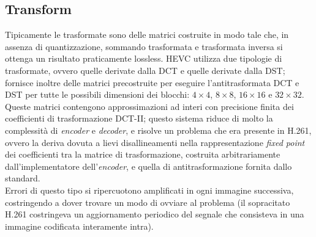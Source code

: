\subsection{Transform}
Tipicamente le trasformate sono delle matrici costruite in modo tale che, in 
assenza di quantizzazione, sommando trasformata e trasformata inversa si 
ottenga un risultato praticamente lossless.
HEVC utilizza due tipologie di trasformate, ovvero quelle derivate dalla DCT e
quelle derivate dalla DST; fornisce inoltre delle matrici precostruite per 
eseguire l'antitrasformata DCT e DST per tutte le possibili dimensioni dei 
blocchi: $4{\times}4$, $8{\times}8$, $16{\times}16$ e $32{\times}32$.
Queste matrici contengono approssimazioni ad interi con precisione finita dei 
coefficienti di trasformazione DCT-II; questo sistema riduce di molto la 
complessità di \textit{encoder} e \textit{decoder}, e risolve un problema che 
era presente in H.261, ovvero la deriva dovuta a lievi disallineamenti nella 
rappresentazione \textit{fixed point} dei coefficienti tra la matrice di 
trasformazione, costruita arbitrariamente dall'implementatore 
dell'\textit{encoder}, e quella di antitrasformazione fornita dallo standard. \\
Errori di questo tipo si ripercuotono amplificati in ogni immagine successiva, 
costringendo a dover trovare un modo di ovviare al problema (il sopracitato 
H.261 costringeva un aggiornamento periodico del segnale che consisteva in una 
immagine codificata interamente intra).


